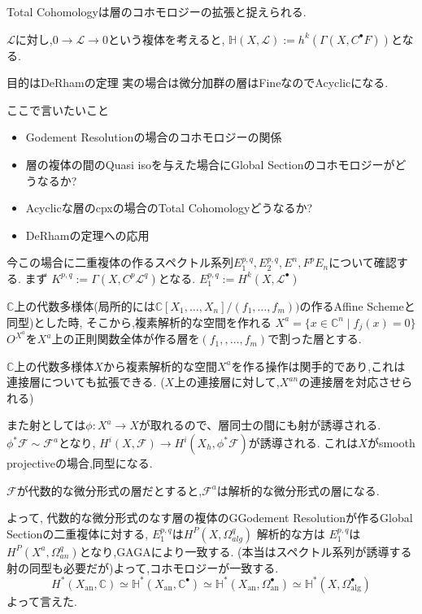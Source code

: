 Total Cohomologyは層のコホモロジーの拡張と捉えられる.

$\mathcal{L}$に対し,$0 \to \mathcal{L} \to 0$という複体を考えると,
$\mathbb{H}(X, \mathcal{L}):= h^k(\Gamma(X, C^{\bullet} F))$となる.

目的はDeRhamの定理
実の場合は微分加群の層はFineなのでAcyclicになる.

ここで言いたいこと
\begin{itemize}
  \item Godement Resolutionの場合のコホモロジーの関係
  \item 層の複体の間のQuasi isoを与えた場合にGlobal Sectionのコホモロジーがどうなるか?
  \item Acyclicな層のcpxの場合のTotal Cohomologyどうなるか?
  \item DeRhamの定理への応用
\end{itemize}


今この場合に二重複体の作るスペクトル系列$E^{p,q}_1, E^{p,q}_2, E^{n}, F^pE_n$について確認する.
まず
$K^{p,q}:=\Gamma(X, C^p \mathcal{L}^q)$となる.
$E^{p,q}_1:= H^k(X, \mathcal{L}^{\bullet})$


$\mathbb{C}$上の代数多様体(局所的には$\mathbb{C}[X_1,\dots,X_n]/(f_1, \ldots, f_m))$の作るAffine Schemeと同型)とした時,
そこから,複素解析的な空間を作れる
$X^a= \{ x \in \mathbb{C}^n \mid f_j(x) = 0 \}$
$O^{X^{a}}$を$X^a$上の正則関数全体が作る層を$(f_1,, \ldots, f_m)$で割った層とする.

$\mathbb{C}$上の代数多様体$X$から複素解析的な空間$X^a$を作る操作は関手的であり,これは連接層についても拡張できる.
($X$上の連接層に対して,$X^{an}$の連接層を対応させられる)

また射としては$\phi: X^{a} \to X$が取れるので、層同士の間にも射が誘導される.
$\phi^* \mathcal{F} \sim \mathcal{F}^a$となり,
$H^i(X, \mathcal{F}) \to H^i(X_h, \phi^* \mathcal{F})$が誘導される.
これは$X$がsmooth projectiveの場合,同型になる.

$\mathcal{F}$が代数的な微分形式の層だとすると,$\mathcal{F}^a$は解析的な微分形式の層になる.

よって,
代数的な微分形式のなす層の複体のGGodement Resolutionが作るGlobal Sectionの二重複体に対する,
$E_1^{p,q}$は$H^P(X, \Omega_{alg}^q)$
解析的な方は
$E_1^{p,q}$は$H^P(X^a, \Omega_{an}^q)$となり,GAGAにより一致する.
(本当はスペクトル系列が誘導する射の同型も必要だが)よって,コホモロジーが一致する.
$$
H^{*}\left(X_{\mathrm{an}}, \mathbb{\mathbb { C }}\right) \simeq
\mathbb{H}^{*}\left(X_{\mathrm{an}}, \mathbb{C}^{\bullet}\right) \simeq
\mathbb{H}^{*}\left(X_{\mathrm{an}}, \Omega_{\mathrm{an}}^{\bullet}\right) \simeq
\mathbb{H}^{*} \left(X, \Omega_{\mathrm{alg}}^{\bullet}\right)
$$
よって言えた.